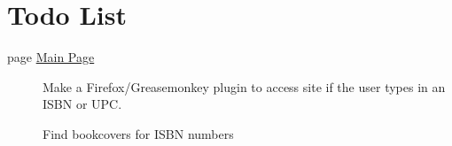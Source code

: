 \hypertarget{todo}{}\section{Todo List}\label{todo}
\label{todo__todo000001}
\hypertarget{todo__todo000001}{}
 \begin{description}
\item[page \hyperlink{index}{Main Page} ]Make a Firefox/Greasemonkey plugin to access site if the user types in an ISBN or UPC. 

Find bookcovers for ISBN numbers

\end{description}

